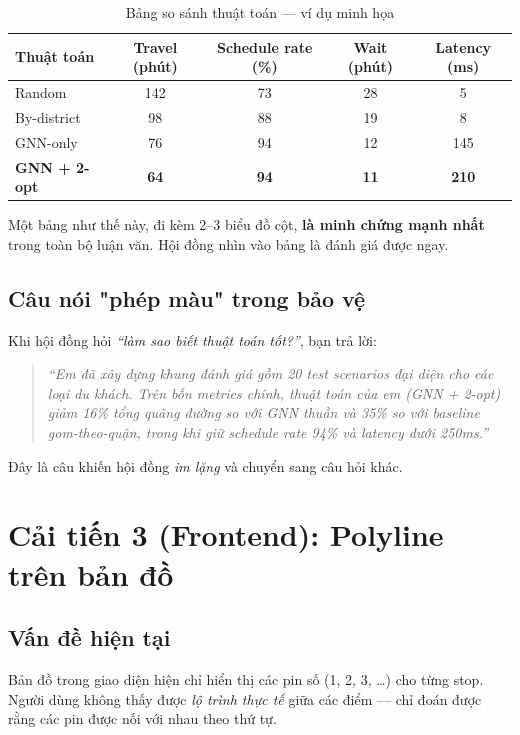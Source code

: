 \documentclass[12pt,a4paper]{report}
\begin{document}
\begin{table}[H]
\centering
\caption{Bảng so sánh thuật toán --- ví dụ minh họa}
\begin{tabular}{lcccc}
\toprule
\textbf{Thuật toán} & \textbf{Travel (phút)} & \textbf{Schedule rate (\%)} & \textbf{Wait (phút)} & \textbf{Latency (ms)} \\
\midrule
Random            & 142 & 73 & 28 & 5 \\
By-district       & 98  & 88 & 19 & 8 \\
GNN-only          & 76  & 94 & 12 & 145 \\
\textbf{GNN + 2-opt} & \textbf{64}  & \textbf{94} & \textbf{11} & \textbf{210} \\
\bottomrule
\end{tabular}
\end{table}

Một bảng như thế này, đi kèm 2--3 biểu đồ cột, \textbf{là minh chứng mạnh nhất} trong toàn bộ luận văn. Hội đồng nhìn vào bảng là đánh giá được ngay.

\section{Câu nói "phép màu" trong bảo vệ}

Khi hội đồng hỏi \textit{``làm sao biết thuật toán tốt?''}, bạn trả lời:

\begin{quote}
\textit{``Em đã xây dựng khung đánh giá gồm 20 test scenarios đại diện cho các loại du khách. Trên bốn metrics chính, thuật toán của em (GNN + 2-opt) giảm 16\% tổng quãng đường so với GNN thuần và 35\% so với baseline gom-theo-quận, trong khi giữ schedule rate 94\% và latency dưới 250ms.''}
\end{quote}

Đây là câu khiến hội đồng \textit{im lặng} và chuyển sang câu hỏi khác.

\chapter{Cải tiến 3 (Frontend): Polyline trên bản đồ}

\section{Vấn đề hiện tại}

Bản đồ trong giao diện hiện chỉ hiển thị các pin số (1, 2, 3, \ldots) cho từng stop. Người dùng không thấy được \textit{lộ trình thực tế} giữa các điểm --- chỉ đoán được rằng các pin được nối với nhau theo thứ tự.
\end{document}
